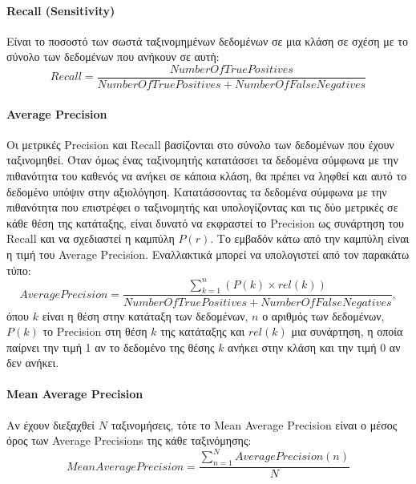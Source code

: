 \paragraph*{Recall (Sensitivity)}
Είναι το ποσοστό των σωστά ταξινομημένων δεδομένων σε μια κλάση σε σχέση με το σύνολο των δεδομένων που ανήκουν σε αυτή:
\begin{equation}
Recall = \dfrac{Number Of True Positives}{Number Of True Positives + Number Of False Negatives}
\end{equation}

\paragraph*{Average Precision}
Οι μετρικές Precision και Recall βασίζονται στο σύνολο των δεδομένων που έχουν ταξινομηθεί. Όταν όμως ένας ταξινομητής κατατάσσει τα δεδομένα σύμφωνα με την πιθανότητα του καθενός να ανήκει σε κάποια κλάση, θα πρέπει να ληφθεί και αυτό το δεδομένο υπόψιν στην αξιολόγηση. Κατατάσσοντας τα δεδομένα σύμφωνα με την πιθανότητα που επιστρέφει ο ταξινομητής και υπολογίζοντας και τις δύο μετρικές σε κάθε θέση της κατάταξης, είναι δυνατό να εκφραστεί το Precision ως συνάρτηση του Recall και να σχεδιαστεί η καμπύλη $P(r)$. Το εμβαδόν κάτω από την καμπύλη είναι η τιμή του Average Precision. Εναλλακτικά μπορεί να υπολογιστεί από τον παρακάτω τύπο:
\begin{equation}
Average Precision = \dfrac{\sum_{k = 1}^{n}(P(k) \times rel(k))}{Number Of True Positives + Number Of False Negatives},
\end{equation}
όπου $k$ είναι η θέση στην κατάταξη των δεδομένων, $n$ ο αριθμός των δεδομένων, $P(k)$ το Precision στη θέση $k$ της κατάταξης και $rel(k)$ μια συνάρτηση, η οποία παίρνει την τιμή 1 αν το δεδομένο της θέσης $k$ ανήκει στην κλάση και την τιμή 0 αν δεν ανήκει.

\paragraph*{Mean Average Precision}
Αν έχουν διεξαχθεί $N$ ταξινομήσεις, τότε το Mean Average Precision είναι ο μέσος όρος των Average Precisions της κάθε ταξινόμησης:
\begin{equation}
Mean Average Precision = \dfrac{\sum_{n = 1}^{N}Average Precision(n)}{N}
\end{equation}


